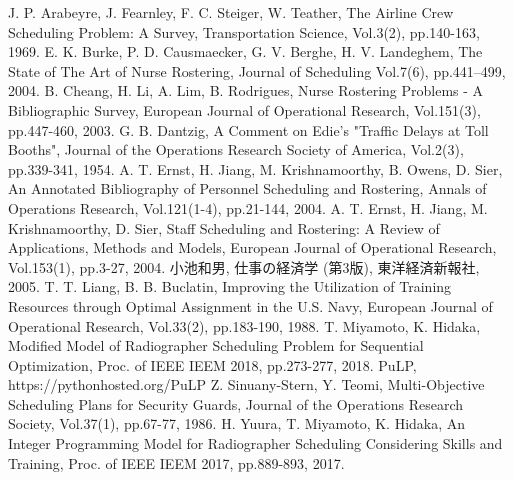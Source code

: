 \documentclass[11pt]{jsarticle}
\begin{document}
\begin{thebibliography}{99}
    J. P. Arabeyre, J. Fearnley, F. C. Steiger, W. Teather,
    The Airline Crew Scheduling Problem: A Survey,
    Transportation Science,
	Vol.3(2), pp.140-163, 1969.
    E. K. Burke, P. D. Causmaecker, G. V. Berghe, H. V. Landeghem,
    The State of The Art of Nurse Rostering,
    Journal of Scheduling Vol.7(6), pp.441–499, 2004.
    B. Cheang, H. Li, A. Lim, B. Rodrigues,
    Nurse Rostering Problems - A Bibliographic Survey,
    European Journal of Operational Research,
    Vol.151(3), pp.447-460, 2003.
    G. B. Dantzig, A Comment on Edie's "Traffic Delays at Toll Booths",
    Journal of the Operations Research Society of America,
    Vol.2(3), pp.339-341, 1954.
    A. T. Ernst, H. Jiang, M. Krishnamoorthy, B. Owens, D. Sier,
    An Annotated Bibliography of Personnel Scheduling and Rostering,
    Annals of Operations Research,
    Vol.121(1-4), pp.21-144, 2004.
    A. T. Ernst, H. Jiang, M. Krishnamoorthy, D. Sier,
    Staff Scheduling and Rostering: A Review of Applications, Methods and Models,
    European Journal of Operational Research,
    Vol.153(1), pp.3-27, 2004.
    小池和男, 仕事の経済学 (第3版), 東洋経済新報社, 2005.
    T. T. Liang, B. B. Buclatin, Improving the Utilization of Training Resources through Optimal Assignment in the U.S. Navy,
    European Journal of Operational Research,
    Vol.33(2), pp.183-190, 1988.
    T. Miyamoto, K. Hidaka,
    Modified Model of Radiographer Scheduling Problem for Sequential Optimization,
    Proc. of IEEE IEEM 2018, pp.273-277, 2018.
    PuLP, https://pythonhosted.org/PuLP
    Z. Sinuany-Stern, Y. Teomi, Multi-Objective Scheduling Plans for Security Guards,
    Journal of the Operations Research Society,
    Vol.37(1), pp.67-77, 1986.
    H. Yuura, T. Miyamoto, K. Hidaka,
    An Integer Programming Model for Radiographer Scheduling Considering Skills and Training,
    Proc. of IEEE IEEM 2017, pp.889-893, 2017.
\end{thebibliography}
\end{document}
